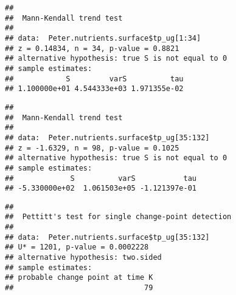 \documentclass[]{article}
\newenvironment{Shaded}{\begin{snugshade}}{\end{snugshade}}
\newcommand{\KeywordTok}[1]{\textcolor[rgb]{0.13,0.29,0.53}{\textbf{#1}}}
\newcommand{\DecValTok}[1]{\textcolor[rgb]{0.00,0.00,0.81}{#1}}
\newcommand{\CommentTok}[1]{\textcolor[rgb]{0.56,0.35,0.01}{\textit{#1}}}
\newcommand{\OperatorTok}[1]{\textcolor[rgb]{0.81,0.36,0.00}{\textbf{#1}}}
\newcommand{\NormalTok}[1]{#1}
\begin{document}
\begin{verbatim}
## 
##  Mann-Kendall trend test
## 
## data:  Peter.nutrients.surface$tp_ug[1:34]
## z = 0.14834, n = 34, p-value = 0.8821
## alternative hypothesis: true S is not equal to 0
## sample estimates:
##            S         varS          tau 
## 1.100000e+01 4.544333e+03 1.971355e-02
\end{verbatim}

\begin{Shaded}
\end{Shaded}

\begin{verbatim}
## 
##  Mann-Kendall trend test
## 
## data:  Peter.nutrients.surface$tp_ug[35:132]
## z = -1.6329, n = 98, p-value = 0.1025
## alternative hypothesis: true S is not equal to 0
## sample estimates:
##             S          varS           tau 
## -5.330000e+02  1.061503e+05 -1.121397e-01
\end{verbatim}

\begin{Shaded}
\end{Shaded}

\begin{verbatim}
## 
##  Pettitt's test for single change-point detection
## 
## data:  Peter.nutrients.surface$tp_ug[35:132]
## U* = 1201, p-value = 0.0002228
## alternative hypothesis: two.sided
## sample estimates:
## probable change point at time K 
##                              79
\end{verbatim}

\begin{Shaded}
\end{Shaded}
\end{document}
